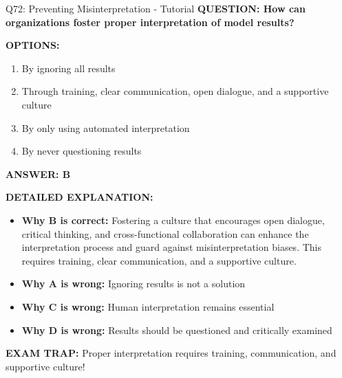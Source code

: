 \documentclass[8pt]{beamer}
\begin{document}
	\begin{frame}{Q72: Preventing Misinterpretation - Tutorial}
		\fontsize{6.5}{7.5}\selectfont
		\textbf{QUESTION: How can organizations foster proper interpretation of model results?}
		
		\vspace{0.1cm}
		\textbf{OPTIONS:}
		\begin{enumerate}
			\item By ignoring all results
			\item Through training, clear communication, open dialogue, and a supportive culture
			\item By only using automated interpretation
			\item By never questioning results
		\end{enumerate}
		
		\vspace{0.1cm}
		\textcolor{myblue}{\textbf{ANSWER: B}}
		
		\vspace{0.1cm}
		\textbf{DETAILED EXPLANATION:}
		\begin{itemize}
			\item \textbf{Why B is correct:} Fostering a culture that encourages open dialogue, critical thinking, and cross-functional collaboration can enhance the interpretation process and guard against misinterpretation biases. This requires training, clear communication, and a supportive culture.
			\item \textbf{Why A is wrong:} Ignoring results is not a solution
			\item \textbf{Why C is wrong:} Human interpretation remains essential
			\item \textbf{Why D is wrong:} Results should be questioned and critically examined
		\end{itemize}
		
		\textcolor{myred}{\textbf{EXAM TRAP:}} Proper interpretation requires \textcolor{myblue}{training, communication, and supportive culture}!
	\end{frame}
	
\end{document}
